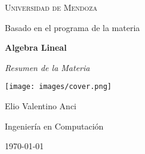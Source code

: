 \begin{titlepage}
  \centering
  \vspace*{2cm} %

  {\scshape\LARGE Universidad de Mendoza\par}
  \vspace{2cm}
  {\large Basado en el programa de la materia\par}
  \vspace{1.5cm}

  {\Huge\bfseries Algebra Lineal\par}
  \vspace{0.5cm}
  {\Large\itshape Resumen de la Materia\par} %

  \vspace{1.5cm}
  \texttt{[image: images/cover.png]} %
  \vspace{2.5cm}

  {\Large Elio Valentino Anci\par}
  {\large Ingeniería en Computación\par}

  \vfill

  {\large \today\par}
\end{titlepage}